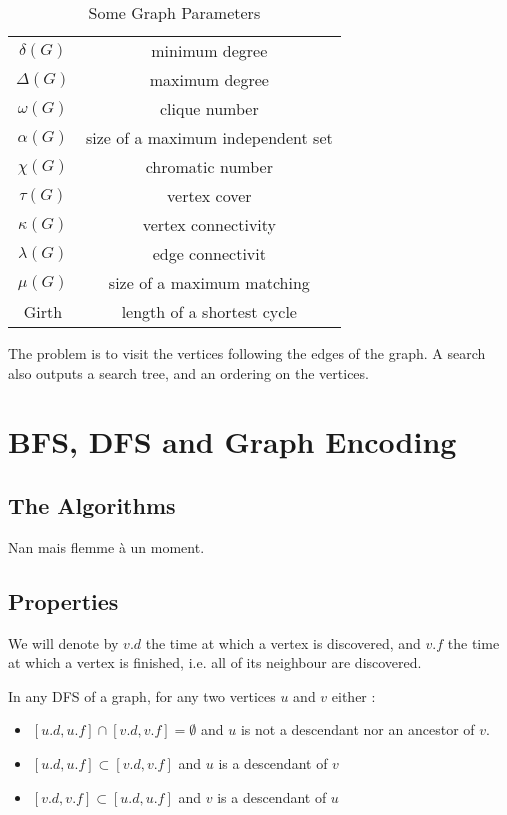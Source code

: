 \documentclass{cours}
\begin{document}
\begin{table*}
    \caption{Some Graph Parameters}
    \begin{tabular}{cc}
        $\delta(G)$ & minimum degree \\
        $\Delta(G)$ & maximum degree\\
        $\omega(G)$ & clique number\\
        $\alpha(G)$ & size of a maximum independent set\\
        $\chi(G)$ & chromatic number\\
        $\tau(G)$ & vertex cover\\
        $\kappa(G)$ & vertex connectivity\\
        $\lambda(G)$ & edge connectivit\\
        $\mu(G)$ & size of a maximum matching\\
        Girth & length of a shortest cycle \\
    \end{tabular}
\end{table*}


\begin{definition}
    The problem is to visit the vertices following the edges of the graph. A search also outputs a search tree, and an ordering on the vertices.
\end{definition}

\section{BFS, DFS and Graph Encoding}
    \subsection{The Algorithms}
        Nan mais flemme à un moment.\\

    \subsection{Properties}
        \begin{definition}
            We will denote by $v.d$ the time at which a vertex is discovered, and $v.f$ the time at which a vertex is finished, i.e. all of its neighbour are discovered.
        \end{definition}
        \begin{theorem}
            In any DFS of a graph, for any two vertices $u$ and $v$ either : 
            \begin{itemize}
                \item $\left[u.d, u.f\right]\cap \left[v.d, v.f\right] = \emptyset$ and $u$ is not a descendant nor an ancestor of $v$.
                \item $\left[u.d, u.f\right] \subset \left[v.d, v.f\right]$ and $u$ is a descendant of $v$
                \item $\left[v.d, v.f\right] \subset \left[u.d, u.f\right]$ and $v$ is a descendant of $u$
            \end{itemize}
        \end{theorem}
\end{document}

